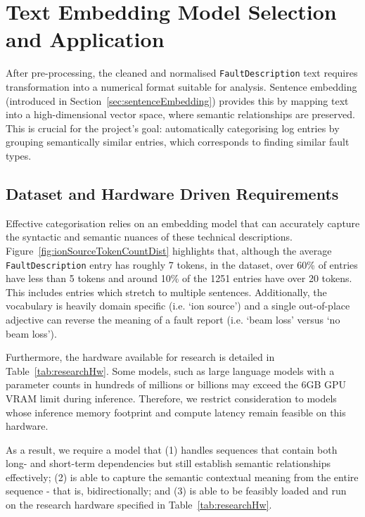 \documentclass[10pt,oneside]{report}
\begin{document}
\section{Text Embedding Model Selection and Application}
After pre-processing, the cleaned and normalised \texttt{FaultDescription} text requires transformation into a numerical format suitable for analysis. Sentence embedding (introduced in Section~\ref{sec:sentenceEmbedding}) provides this by mapping text into a high-dimensional vector space, where semantic relationships are preserved. This is crucial for the project's goal: automatically categorising log entries by grouping semantically similar entries, which corresponds to finding similar fault types. 

\subsection{Dataset and Hardware Driven Requirements}\label{sec:req}
Effective categorisation relies on an embedding model that can accurately capture the syntactic and semantic nuances of these technical descriptions. Figure~\ref{fig:ionSourceTokenCountDist} highlights that, although the average \texttt{FaultDescription} entry has roughly 7 tokens, in the dataset, over 60\% of entries have less than 5 tokens and around 10\% of the 1251 entries have over 20 tokens. This includes entries which stretch to multiple sentences. Additionally, the vocabulary is heavily domain specific (i.e. `ion source') and a single out-of-place adjective can reverse the meaning of a fault report (i.e. `beam loss' versus `no beam loss').  

Furthermore, the hardware available for research is detailed in Table~\ref{tab:researchHw}. Some models, such as large language models with a parameter counts in hundreds of millions or billions may exceed the 6GB GPU VRAM limit during inference. Therefore, we restrict consideration to models whose inference memory footprint and compute latency remain feasible on this hardware.

As a result, we require a model that (1) handles sequences that contain both long- and short-term dependencies but still establish semantic relationships effectively; (2) is able to capture the semantic contextual meaning from the entire sequence - that is, bidirectionally; and (3) is able to be feasibly loaded and run on the research hardware specified in Table~\ref{tab:researchHw}.
\end{document}
